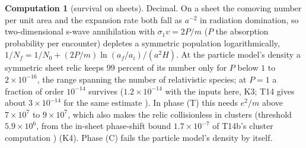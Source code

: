 \documentclass[11pt]{article}
\theoremstyle{definition}
\newtheorem{computation}[theorem]{Computation}
\begin{document}
\begin{computation}[survival on sheets]\label{prop:sheetsurvival}
Decimal. On a sheet the comoving number per unit area and the expansion rate both fall as $a^{-2}$ in radiation domination, so two-dimensional s-wave annihilation with $\sigma_{1}v = 2P/m$ ($P$ the absorption probability per encounter) depletes a symmetric population logarithmically, $1/N_{f} = 1/N_{0} + (2P/m)\ln(a_{f}/a_{i})/(a^{2}H)$. At the particle model's density a symmetric sheet relic keeps $99$ percent of its number only for $P$ below $1$ to $2 \times 10^{-16}$, the range spanning the number of relativistic species; at $P = 1$ a fraction of order $10^{-14}$ survives ($1.2 \times 10^{-14}$ with the inputs here, K3; T14 gives about $3 \times 10^{-14}$ for the same estimate \cite[Sec.~7.7]{ButlerT14}). In phase (T) this needs $e^{2}/m$ above $7 \times 10^{7}$ to $9 \times 10^{7}$, which also makes the relic collisionless in clusters (threshold $5.9 \times 10^{6}$, from the in-sheet phase-shift bound $1.7 \times 10^{-7}$ of T14b's cluster computation \cite[Comp.~3.3, Prem.~2.12]{ButlerT14b}) (K4). Phase (C) fails the particle model's density by itself.
\end{computation}
\end{document}
